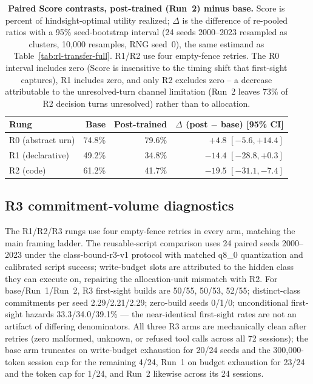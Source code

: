 \documentclass{article}
\begin{document}
\begin{table}
\centering
\begin{tabular}{@{}lrrr@{}}
\hline
Rung & Base & Post-trained & $\Delta$ (post $-$ base) [95\% CI] \\
\hline
R0 (abstract urn)  & 74.8\% & 79.6\% & $+4.8$ $[-5.6,+14.4]$ \\
R1 (declarative)   & 49.2\% & 34.8\% & $-14.4$ $[-28.8,+0.3]$ \\
R2 (code)          & 61.2\% & 41.7\% & $-19.5$ $[-31.1,-7.4]$ \\
\hline
\end{tabular}
\caption{\textbf{Paired Score contrasts, post-trained (Run~2) minus base.} Score
is percent of hindsight-optimal utility realized; $\Delta$ is the difference of
re-pooled ratios with a 95\% seed-bootstrap interval (24 seeds 2000--2023
resampled as clusters, 10{,}000 resamples, RNG seed~0), the same estimand as
Table~\ref{tab:rl-transfer-full}. R1/R2 use four empty-fence retries. The R0
interval includes zero (Score is insensitive to the timing shift that first-sight
captures), R1 includes zero, and only R2 excludes zero -- a decrease attributable
to the unresolved-turn channel limitation (Run~2 leaves 73\% of R2 decision turns
unresolved) rather than to allocation.}
\label{tab:qwen-score-paired}
\end{table}

\subsection{R3 commitment-volume diagnostics}

The R1/R2/R3 rungs use four empty-fence retries in every arm, matching the main framing ladder. The reusable-script comparison uses 24 paired seeds 2000--2023 under the class-bound-r3-v1 protocol with matched q8\_0 quantization and calibrated script success; write-budget slots are attributed to the hidden class they can execute on, repairing the allocation-unit mismatch with R2. For base/Run~1/Run~2, R3 first-sight builds are 50/55, 50/53, 52/55; distinct-class commitments per seed 2.29/2.21/2.29; zero-build seeds 0/1/0; unconditional first-sight hazards 33.3/34.0/39.1\% --- the near-identical first-sight rates are not an artifact of differing denominators. All three R3 arms are mechanically clean after retries (zero malformed, unknown, or refused tool calls across all 72 sessions); the base arm truncates on write-budget exhaustion for 20/24 seeds and the 300,000-token session cap for the remaining 4/24, Run~1 on budget exhaustion for 23/24 and the token cap for 1/24, and Run~2 likewise across its 24 sessions.
\end{document}
